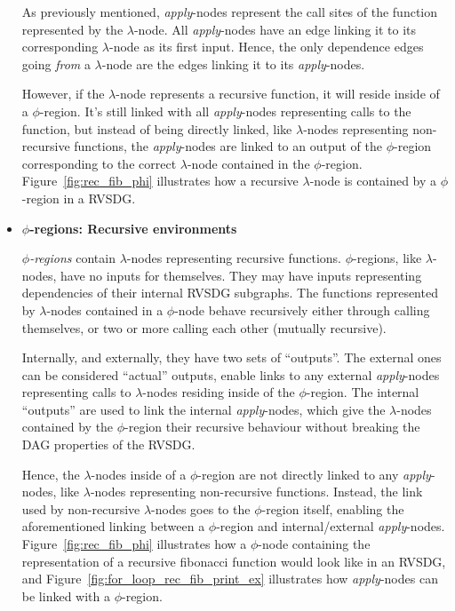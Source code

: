 \begin{itemize}
As previously mentioned, \textit{apply}-nodes represent the call sites of the
function represented by the $\lambda$-node. All \textit{apply}-nodes have an
edge linking it to its corresponding $\lambda$-node as its first input. Hence,
the only dependence edges going \textit{from} a $\lambda$-node are the edges
linking it to its \textit{apply}-nodes.

However, if the $\lambda$-node represents a recursive function, it will reside
inside of a $\phi$-region. It's still linked with all \textit{apply}-nodes
representing calls to the function, but instead of being directly linked, like
$\lambda$-nodes representing non-recursive functions, the \textit{apply}-nodes
are linked to an output of the $\phi$-region corresponding to the correct
$\lambda$-node contained in the $\phi$-region. Figure~\ref{fig:rec_fib_phi}
illustrates how a recursive $\lambda$-node is contained by a $\phi$-region in a
RVSDG.

\item \textbf{$\phi$-regions: Recursive environments}

\textit{$\phi$-regions} contain $\lambda$-nodes representing recursive
functions. $\phi$-regions, like $\lambda$-nodes, have no inputs for themselves.
They may have inputs representing dependencies of their internal RVSDG
subgraphs. The functions represented by $\lambda$-nodes contained in a
$\phi$-node behave recursively either through calling themselves, or two or more
calling each other (mutually recursive).

Internally, and externally, they have two sets of ``outputs''. The external ones
can be considered ``actual'' outputs, enable links to any external
\textit{apply}-nodes representing calls to $\lambda$-nodes residing inside of
the $\phi$-region. The internal ``outputs'' are used to link the internal
\textit{apply}-nodes, which give the $\lambda$-nodes contained by the
$\phi$-region their recursive behaviour without breaking the DAG properties of
the RVSDG.

Hence, the $\lambda$-nodes inside of a $\phi$-region are not directly linked to
any \textit{apply}-nodes, like $\lambda$-nodes representing non-recursive
functions. Instead, the link used by non-recursive $\lambda$-nodes goes to the
$\phi$-region itself, enabling the aforementioned linking between a
$\phi$-region and internal/external \textit{apply}-nodes.
Figure~\ref{fig:rec_fib_phi} illustrates how a $\phi$-node containing the
representation of a recursive fibonacci function would look like in an RVSDG,
and Figure~\ref{fig:for_loop_rec_fib_print_ex} illustrates how
\textit{apply}-nodes can be linked with a $\phi$-region.

\end{itemize}

